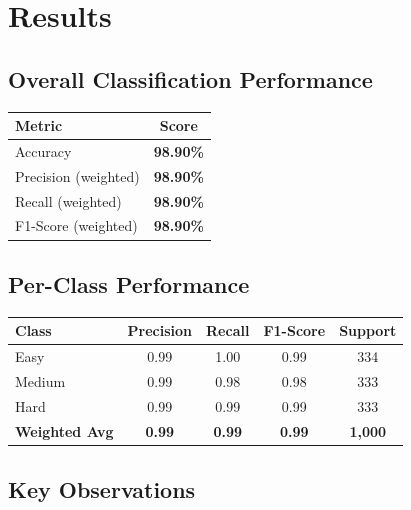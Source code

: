 \documentclass[12pt, a4paper, twoside]{article}
\begin{document}
\section{Results}\label{sec:results}

\subsection{Overall Classification Performance}

\begin{center}
\renewcommand{\arraystretch}{1.4}
\begin{tabular}{l c}
    \toprule
    \textbf{Metric} & \textbf{Score} \\
    \midrule
    Accuracy             & \textbf{98.90\%} \\
    Precision (weighted) & \textbf{98.90\%} \\
    Recall (weighted)    & \textbf{98.90\%} \\
    F1-Score (weighted)  & \textbf{98.90\%} \\
    \bottomrule
\end{tabular}
\end{center}

\subsection{Per-Class Performance}

\begin{center}
\renewcommand{\arraystretch}{1.4}
\begin{tabular}{l cccc}
    \toprule
    \textbf{Class} & \textbf{Precision} & \textbf{Recall} &
    \textbf{F1-Score} & \textbf{Support} \\
    \midrule
    \textcolor{easygreen}{Easy}   & 0.99 & 1.00 & 0.99 & 334 \\
    \textcolor{medamber}{Medium}  & 0.99 & 0.98 & 0.98 & 333 \\
    \textcolor{hardred}{Hard}     & 0.99 & 0.99 & 0.99 & 333 \\
    \midrule
    \textbf{Weighted Avg} & \textbf{0.99} & \textbf{0.99} &
    \textbf{0.99} & \textbf{1{,}000} \\
    \bottomrule
\end{tabular}
\end{center}

\subsection{Key Observations}
\end{document}
